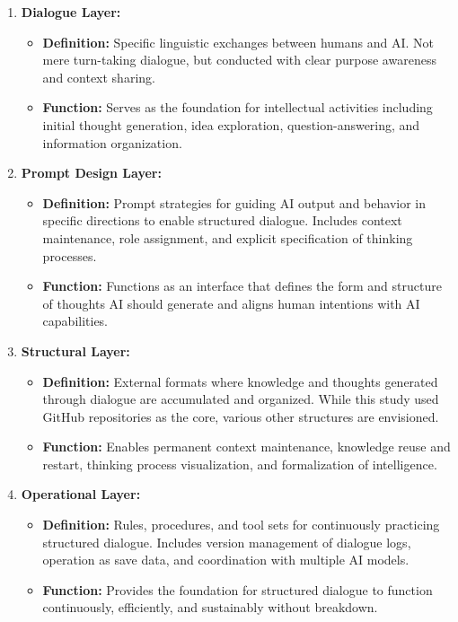 \documentclass[11pt]{article}
\begin{document}
\begin{enumerate}
\item \textbf{Dialogue Layer:}
\begin{itemize}
\item \textbf{Definition:} Specific linguistic exchanges between humans and AI. Not mere turn-taking dialogue, but conducted with clear purpose awareness and context sharing.
\item \textbf{Function:} Serves as the foundation for intellectual activities including initial thought generation, idea exploration, question-answering, and information organization.
\end{itemize}

\item \textbf{Prompt Design Layer:}
\begin{itemize}
\item \textbf{Definition:} Prompt strategies for guiding AI output and behavior in specific directions to enable structured dialogue. Includes context maintenance, role assignment, and explicit specification of thinking processes.
\item \textbf{Function:} Functions as an interface that defines the form and structure of thoughts AI should generate and aligns human intentions with AI capabilities.
\end{itemize}

\item \textbf{Structural Layer:}
\begin{itemize}
\item \textbf{Definition:} External formats where knowledge and thoughts generated through dialogue are accumulated and organized. While this study used GitHub repositories as the core, various other structures are envisioned.
\item \textbf{Function:} Enables permanent context maintenance, knowledge reuse and restart, thinking process visualization, and formalization of intelligence.
\end{itemize}

\item \textbf{Operational Layer:}
\begin{itemize}
\item \textbf{Definition:} Rules, procedures, and tool sets for continuously practicing structured dialogue. Includes version management of dialogue logs, operation as save data, and coordination with multiple AI models.
\item \textbf{Function:} Provides the foundation for structured dialogue to function continuously, efficiently, and sustainably without breakdown.
\end{itemize}


\end{enumerate}
\end{document}
